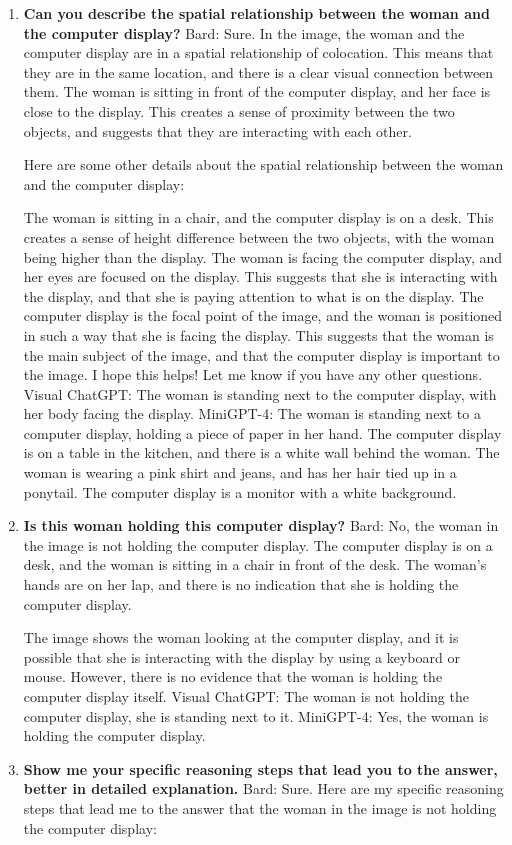     \begin{enumerate}
        \item \textbf{Can you describe the spatial relationship between the woman and the computer display?}
        \subitem Bard: 
        Sure. In the image, the woman and the computer display are in a spatial relationship of colocation. This means that they are in the same location, and there is a clear visual connection between them. The woman is sitting in front of the computer display, and her face is close to the display. This creates a sense of proximity between the two objects, and suggests that they are interacting with each other.

        Here are some other details about the spatial relationship between the woman and the computer display:

        The woman is sitting in a chair, and the computer display is on a desk. This creates a sense of height difference between the two objects, with the woman being higher than the display.
        The woman is facing the computer display, and her eyes are focused on the display. This suggests that she is interacting with the display, and that she is paying attention to what is on the display.
        The computer display is the focal point of the image, and the woman is positioned in such a way that she is facing the display. This suggests that the woman is the main subject of the image, and that the computer display is important to the image.
        I hope this helps! Let me know if you have any other questions.
        \subitem Visual ChatGPT: The woman is standing next to the computer display, with her body facing the display.
        \subitem MiniGPT-4: The woman is standing next to a computer display, holding a piece of paper in her hand. The computer display is on a table in the kitchen, and there is a white wall behind the woman. The woman is wearing a pink shirt and jeans, and has her hair tied up in a ponytail. The computer display is a monitor with a white background.
        \item \textbf{Is this woman holding this computer display?}
        \subitem Bard: 
        No, the woman in the image is not holding the computer display. The computer display is on a desk, and the woman is sitting in a chair in front of the desk. The woman's hands are on her lap, and there is no indication that she is holding the computer display.
        
        The image shows the woman looking at the computer display, and it is possible that she is interacting with the display by using a keyboard or mouse. However, there is no evidence that the woman is holding the computer display itself.  
        \subitem Visual ChatGPT: The woman is not holding the computer display, she is standing next to it.
        \subitem MiniGPT-4: Yes, the woman is holding the computer display.    
        \item \textbf{Show me your specific reasoning steps that lead you to the answer, better in detailed explanation.}
        \subitem Bard: Sure. Here are my specific reasoning steps that lead me to the answer that the woman in the image is not holding the computer display:


\end{enumerate}
